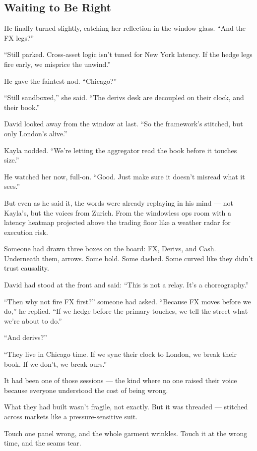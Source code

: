 \subsection{Waiting to Be Right}

He finally turned slightly, catching her reflection in the window glass.
“And the FX legs?”

“Still parked. Cross-asset logic isn’t tuned for New York latency. If the hedge legs fire early, we misprice the unwind.”

He gave the faintest nod.
“Chicago?”

“Still sandboxed,” she said. “The derivs desk are decoupled on their clock, and their book.”

David looked away from the window at last.
“So the framework’s stitched, but only London’s alive.”

Kayla nodded.
“We’re letting the aggregator read the book before it touches size.”

He watched her now, full-on.
“Good. Just make sure it doesn’t misread what it sees.”

But even as he said it, the words were already replaying in his mind —
not Kayla’s, but the voices from Zurich.
From the windowless ops room with a latency heatmap projected above the trading floor like a weather 
radar for execution risk.

Someone had drawn three boxes on the board: FX, Derivs, and Cash.
Underneath them, arrows. Some bold. Some dashed. Some curved like they didn’t trust causality.

David had stood at the front and said:
“This is not a relay. It’s a choreography.”

“Then why not fire FX first?” someone had asked.
“Because FX moves before we do,” he replied. “If we hedge before the primary touches, we tell the 
street what we’re about to do.”

“And derivs?”

“They live in Chicago time. If we sync their clock to London, we break their book. If we don’t, 
we break ours.”

It had been one of those sessions — the kind where no one raised their voice because everyone 
understood the cost of being wrong.

What they had built wasn’t fragile, not exactly.
But it was threaded — stitched across markets like a pressure-sensitive suit.

Touch one panel wrong, and the whole garment wrinkles.
Touch it at the wrong time, and the seams tear.

